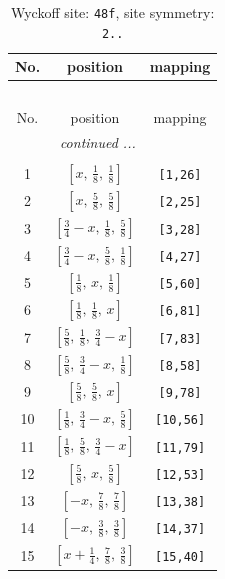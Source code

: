 \documentclass[fleqn,8pt]{jsarticle}
\begin{document}
\begin{longtable}{ccc}
\caption{Wyckoff site: {\tt 48f}, site symmetry: {\tt 2..}}
 \\
 \hline \hline
No. & position & mapping \\ \hline \endfirsthead

\multicolumn{2}{l}{\tablename\ \thetable{}} \\
 \hline \hline
No. & position & mapping \\ \hline \endhead

 \hline \hline
\multicolumn{2}{r}{\footnotesize\it continued ...} \\ \endfoot

 \hline \hline
\multicolumn{2}{r}{} \\ \endlastfoot

1 & $\left[ x,\, \frac{1}{8},\, \frac{1}{8} \right]$ & {\tt [1,26]} \\ \hline
2 & $\left[ x,\, \frac{5}{8},\, \frac{5}{8} \right]$ & {\tt [2,25]} \\ \hline
3 & $\left[ \frac{3}{4} - x,\, \frac{1}{8},\, \frac{5}{8} \right]$ & {\tt [3,28]} \\ \hline
4 & $\left[ \frac{3}{4} - x,\, \frac{5}{8},\, \frac{1}{8} \right]$ & {\tt [4,27]} \\ \hline
5 & $\left[ \frac{1}{8},\, x,\, \frac{1}{8} \right]$ & {\tt [5,60]} \\ \hline
6 & $\left[ \frac{1}{8},\, \frac{1}{8},\, x \right]$ & {\tt [6,81]} \\ \hline
7 & $\left[ \frac{5}{8},\, \frac{1}{8},\, \frac{3}{4} - x \right]$ & {\tt [7,83]} \\ \hline
8 & $\left[ \frac{5}{8},\, \frac{3}{4} - x,\, \frac{1}{8} \right]$ & {\tt [8,58]} \\ \hline
9 & $\left[ \frac{5}{8},\, \frac{5}{8},\, x \right]$ & {\tt [9,78]} \\ \hline
10 & $\left[ \frac{1}{8},\, \frac{3}{4} - x,\, \frac{5}{8} \right]$ & {\tt [10,56]} \\ \hline
11 & $\left[ \frac{1}{8},\, \frac{5}{8},\, \frac{3}{4} - x \right]$ & {\tt [11,79]} \\ \hline
12 & $\left[ \frac{5}{8},\, x,\, \frac{5}{8} \right]$ & {\tt [12,53]} \\ \hline
13 & $\left[ - x,\, \frac{7}{8},\, \frac{7}{8} \right]$ & {\tt [13,38]} \\ \hline
14 & $\left[ - x,\, \frac{3}{8},\, \frac{3}{8} \right]$ & {\tt [14,37]} \\ \hline
15 & $\left[ x + \frac{1}{4},\, \frac{7}{8},\, \frac{3}{8} \right]$ & {\tt [15,40]} \\ \hline

\end{longtable}
\end{document}
